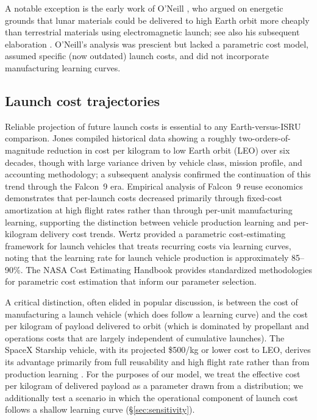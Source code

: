 \documentclass[preprint,12pt]{elsarticle}
\begin{document}
A notable exception is the early work of O'Neill \cite{oneill1974}, who argued on energetic grounds that lunar materials could be delivered to high Earth orbit more cheaply than terrestrial materials using electromagnetic launch; see also his subsequent elaboration \cite{oneill1976}. O'Neill's analysis was prescient but lacked a parametric cost model, assumed specific (now outdated) launch costs, and did not incorporate manufacturing learning curves.

\subsection{Launch cost trajectories}

Reliable projection of future launch costs is essential to any Earth-versus-ISRU comparison. Jones \cite{jones2018} compiled historical data showing a roughly two-orders-of-magnitude reduction in cost per kilogram to low Earth orbit (LEO) over six decades, though with large variance driven by vehicle class, mission profile, and accounting methodology; a subsequent analysis \cite{jones2020} confirmed the continuation of this trend through the Falcon~9 era. Empirical analysis of Falcon~9 reuse economics \cite{zapata2019} demonstrates that per-launch costs decreased primarily through fixed-cost amortization at high flight rates rather than through per-unit manufacturing learning, supporting the distinction between vehicle production learning and per-kilogram delivery cost trends. Wertz \cite{wertz2011} provided a parametric cost-estimating framework for launch vehicles that treats recurring costs via learning curves, noting that the learning rate for launch vehicle production is approximately 85--90\%. The NASA Cost Estimating Handbook \cite{nasa2015handbook} provides standardized methodologies for parametric cost estimation that inform our parameter selection.

A critical distinction, often elided in popular discussion, is between the cost of manufacturing a launch vehicle (which does follow a learning curve) and the cost per kilogram of payload delivered to orbit (which is dominated by propellant and operations costs that are largely independent of cumulative launches). The SpaceX Starship vehicle, with its projected \$500/kg or lower cost to LEO, derives its advantage primarily from full reusability and high flight rate rather than from production learning \cite{spacex2023,jones2020}. For the purposes of our model, we treat the effective cost per kilogram of delivered payload as a parameter drawn from a distribution; we additionally test a scenario in which the operational component of launch cost follows a shallow learning curve (\S\ref{sec:sensitivity}).
\end{document}
